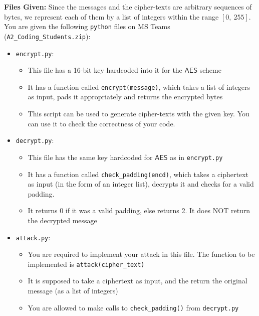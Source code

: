 \documentclass[11pt]{article}
\newcommand{\AES}{\mathsf{AES}}
\begin{document}
            \textbf{Files Given:} Since the messages and the cipher-texts are arbitrary sequences of bytes, we represent each of them by a list of integers within the range $[0, ~255]$. You are given the following \texttt{python} files on MS Teams (\texttt{A2\_Coding\_Students.zip}):
            \begin{itemize}
                \item \texttt{encrypt.py}:
                    \begin{itemize}
                        \item This file has a 16-bit key hardcoded into it for the $\AES$ scheme
                        \item It has a function called \texttt{encrypt(message)}, which takes a list of integers as input,  pads it appropriately and returns the encrypted bytes
                        \item This script can be used to generate cipher-texts with the given key. You can use it to check the correctness of your code.
                    \end{itemize}
                \item \texttt{decrypt.py}:
                    \begin{itemize}
                        \item This file has the same key hardcoded for $\AES$ as in \texttt{encrypt.py}
                        \item It has a function called \texttt{check\_padding(encd)}, which takes a ciphertext as input (in the form of an integer list), decrypts it and checks for a valid padding.
                        \item It returns 0 if it was a valid padding, else returns 2. It does NOT return the decrypted message
                    \end{itemize}
                \item \texttt{attack.py}:
                    \begin{itemize}
                        \item You are required to implement your attack in this file. The function to be implemented is \texttt{attack(cipher\_text)}
                        \item It is supposed to take a ciphertext as input, and the return the original message (as a list of integers)
                        \item You are allowed to make calls to \texttt{check\_padding()} from \texttt{decrypt.py}
                    \end{itemize}
            \end{itemize}
            
\end{document}
